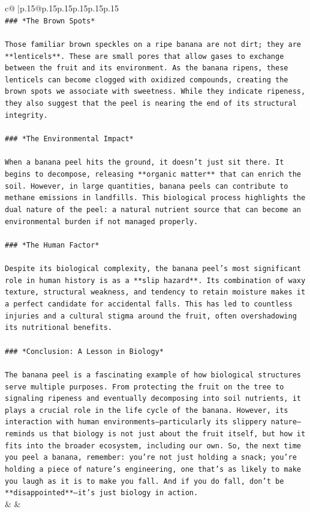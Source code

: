 \documentclass{article}
\begin{document}
{\begin{supertabular}{c@{$\;$}|p{.15\linewidth}@{}p{.15\linewidth}p{.15\linewidth}p{.15\linewidth}p{.15\linewidth}p{.15\linewidth}}
{{{\\ 
\texttt{\#\#\# *The Brown Spots*} \\
\\ 
\texttt{Those familiar brown speckles on a ripe banana are not dirt; they are **lenticels**. These are small pores that allow gases to exchange between the fruit and its environment. As the banana ripens, these lenticels can become clogged with oxidized compounds, creating the brown spots we associate with sweetness. While they indicate ripeness, they also suggest that the peel is nearing the end of its structural integrity.} \\
\\ 
\texttt{\#\#\# *The Environmental Impact*} \\
\\ 
\texttt{When a banana peel hits the ground, it doesn’t just sit there. It begins to decompose, releasing **organic matter** that can enrich the soil. However, in large quantities, banana peels can contribute to methane emissions in landfills. This biological process highlights the dual nature of the peel: a natural nutrient source that can become an environmental burden if not managed properly.} \\
\\ 
\texttt{\#\#\# *The Human Factor*} \\
\\ 
\texttt{Despite its biological complexity, the banana peel’s most significant role in human history is as a **slip hazard**. Its combination of waxy texture, structural weakness, and tendency to retain moisture makes it a perfect candidate for accidental falls. This has led to countless injuries and a cultural stigma around the fruit, often overshadowing its nutritional benefits.} \\
\\ 
\texttt{\#\#\# *Conclusion: A Lesson in Biology*} \\
\\ 
\texttt{The banana peel is a fascinating example of how biological structures serve multiple purposes. From protecting the fruit on the tree to signaling ripeness and eventually decomposing into soil nutrients, it plays a crucial role in the life cycle of the banana. However, its interaction with human environments—particularly its slippery nature—reminds us that biology is not just about the fruit itself, but how it fits into the broader ecosystem, including our own. So, the next time you peel a banana, remember: you’re not just holding a snack; you’re holding a piece of nature’s engineering, one that’s as likely to make you laugh as it is to make you fall. And if you do fall, don’t be **disappointed**—it’s just biology in action.} \\
            }
        }
    }
    & & \\ \\


\end{supertabular}}
\end{document}
